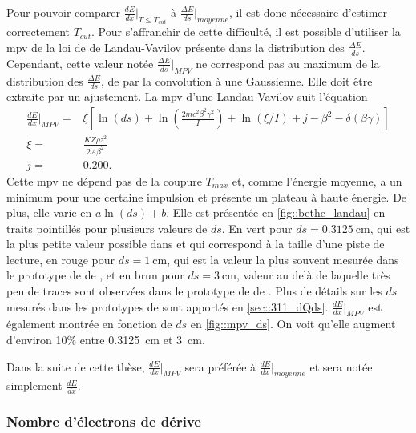         Pour pouvoir comparer $\frac{dE}{dx}\rvert_{T\leq T_{cut}}$ à $\frac{\Delta E}{ds}\rvert_{moyenne}$, il est donc nécessaire d'estimer correctement $T_{cut}$. Pour s'affranchir de cette difficulté, il est possible d'utiliser la \gls{mpv} de la loi de de Landau-Vavilov présente dans la distribution des $\frac{\Delta E}{ds}$. Cependant, cette valeur notée $\frac{\Delta E}{ds}\rvert_{MPV}$ ne correspond pas au maximum de la distribution des $\frac{\Delta E}{ds}$, de par la convolution à une Gaussienne. Elle doit être extraite par un ajustement. La \gls{mpv} d'une Landau-Vavilov suit l'équation\cite{pdg2018}
        \begin{eqnarray}
          \frac{dE}{dx}\biggr\rvert_{MPV} = & \xi\left[\ln(ds) + \ln\left(\frac{2mc^2\beta^2\gamma^2}{I}\right)+\ln(\xi/I)+j-\beta^2 - \delta(\beta\gamma)\right] \label{eq::mpv} \\
          \xi = & \frac{KZ\rho z^2}{2A\beta^2}\nonumber\\
          j = & 0.200.\nonumber
        \end{eqnarray}
        Cette \gls{mpv} ne dépend pas de la coupure $T_{max}$ et, comme l'énergie moyenne, a un minimum pour une certaine impulsion et présente un plateau à haute énergie. De plus, elle varie en $a\ln(ds)+b$. Elle est présentée en \autoref{fig::bethe_landau} en traits pointillés pour plusieurs valeurs de $ds$. En vert pour $ds=\SI{0.3125}{\centi\meter}$, qui est la plus petite valeur possible dans \protodp{} et qui correspond à la taille d'une piste de lecture, en rouge pour $ds=\SI{1}{\centi\meter}$, qui est la valeur la plus souvent mesurée dans le prototype de \TOO{} de \protodp{}, et en brun pour $ds=\SI{3}{\centi\meter}$, valeur au delà de laquelle très peu de traces sont observées dans le prototype de \TOO{} de \protodp{}. Plus de détails sur les $ds$ mesurés dans les prototypes de \protodp{} sont apportés en \autoref{sec::311_dQds}. $\frac{dE}{dx}\rvert_{MPV}$ est également montrée en fonction de $ds$ en \autoref{fig::mpv_ds}. On voit qu'elle augment d'environ 10\;\% entre \SI{0.3125}{\centi\meter} et \SI{3}{\centi\meter}.

        Dans la suite de cette thèse, $\frac{dE}{dx}\rvert_{MPV}$ sera préférée à $\frac{dE}{dx}\rvert_{moyenne}$ et sera notée simplement $\frac{dE}{dx}$.

      \subsubsection{Nombre d'électrons de dérive}

